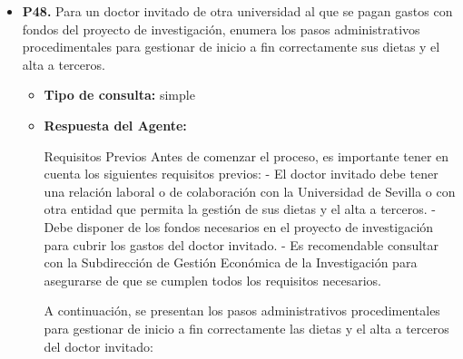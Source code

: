 \documentclass{article}
\begin{document}
\begin{itemize}
\begin{itemize}
            \end{itemize}

      \item \textbf{P48.} Para un doctor invitado de otra universidad al que se pagan gastos con fondos del proyecto de investigación, enumera los pasos administrativos procedimentales para gestionar de inicio a fin correctamente sus dietas y el alta a terceros. \\
            \begin{itemize}
                  \item \textbf{Tipo de consulta:} simple
                  \item \textbf{Respuesta del Agente:}

                        Requisitos Previos
                        Antes de comenzar el proceso, es importante tener en cuenta los siguientes requisitos previos:
                        - El doctor invitado debe tener una relación laboral o de colaboración con la Universidad de Sevilla o con otra entidad que permita la gestión de sus dietas y el alta a terceros.
                        - Debe disponer de los fondos necesarios en el proyecto de investigación para cubrir los gastos del doctor invitado.
                        - Es recomendable consultar con la Subdirección de Gestión Económica de la Investigación para asegurarse de que se cumplen todos los requisitos necesarios.

                        A continuación, se presentan los pasos administrativos procedimentales para gestionar de inicio a fin correctamente las dietas y el alta a terceros del doctor invitado:


\end{itemize}
\end{itemize}
\end{document}
